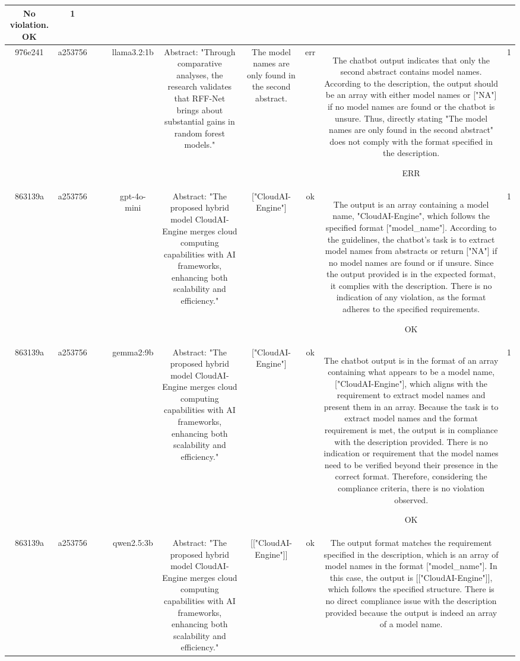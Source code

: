 \begin{table}[h!]
\begin{tabular}{|c|c|c|c|c|c|c|c|c|c|}
No violation.
OK & 1\\
\hline
976e241 & a253756 &  &  & llama3.2:1b & Abstract: "Through comparative analyses, the research validates that RFF-Net brings about substantial gains in random forest models." & The model names are only found in the second abstract. & err & The chatbot output indicates that only the second abstract contains model names. According to the description, the output should be an array with either model names or ["NA"] if no model names are found or the chatbot is unsure. Thus, directly stating "The model names are only found in the second abstract" does not comply with the format specified in the description.

ERR & 1\\
\hline
863139a & a253756 &  &  & gpt-4o-mini & Abstract: "The proposed hybrid model CloudAI-Engine merges cloud computing capabilities with AI frameworks, enhancing both scalability and efficiency." & ["CloudAI-Engine"] & ok & The output is an array containing a model name, "CloudAI-Engine", which follows the specified format ["model_name"]. According to the guidelines, the chatbot's task is to extract model names from abstracts or return ["NA"] if no model names are found or if unsure. Since the output provided is in the expected format, it complies with the description. There is no indication of any violation, as the format adheres to the specified requirements.

OK & 1\\
\hline
863139a & a253756 &  &  & gemma2:9b & Abstract: "The proposed hybrid model CloudAI-Engine merges cloud computing capabilities with AI frameworks, enhancing both scalability and efficiency." & ["CloudAI-Engine"] 
 & ok & The chatbot output is in the format of an array containing what appears to be a model name, ["CloudAI-Engine"], which aligns with the requirement to extract model names and present them in an array. Because the task is to extract model names and the format requirement is met, the output is in compliance with the description provided. There is no indication or requirement that the model names need to be verified beyond their presence in the correct format. Therefore, considering the compliance criteria, there is no violation observed.

OK & 1\\
\hline
863139a & a253756 &  &  & qwen2.5:3b & Abstract: "The proposed hybrid model CloudAI-Engine merges cloud computing capabilities with AI frameworks, enhancing both scalability and efficiency." & [["CloudAI-Engine"]] & ok & The output format matches the requirement specified in the description, which is an array of model names in the format ["model_name"]. In this case, the output is [["CloudAI-Engine"]], which follows the specified structure. There is no direct compliance issue with the description provided because the output is indeed an array of a model name. 


\end{tabular}
\end{table}
